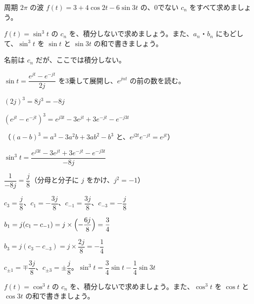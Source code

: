 \begin{jibun}
周期 $2\pi$ の波 $f(t)=3+4\cos2t-6\sin3t$ の、0でない $c_n$ をすべて求めましょう。
\end{jibun}


\begin{reidai}
$f(t)=\sin^3t$ の $c_n$ を、積分しないで求めましょう。また、$a_n$・$b_n$ にもどして、$\sin^3t$ を $\sin t$ と $\sin3t$ の和で書きましょう。\par
\kangaekata {}\par
{}\enspace 名前は $c_n$ だが、ここでは積分しない。\par
{}\enspace $\sin t=\dfrac{e^{jt}-e^{-jt}}{2j}$ を3乗して展開し、$e^{jnt}$ の前の数を読む。\par
\shiki\kixds{}\zw{} $(2j)^3=8j^3=-8j$\par
\kixda $(e^{jt}-e^{-jt})^3=e^{j3t}-3e^{jt}+3e^{-jt}-e^{-j3t}$\par
\kixdb （$(a-b)^3=a^3-3a^2b+3ab^2-b^3$ と、$e^{j2t}e^{-jt}=e^{jt}$）\par
\kixda $\sin^3t=\dfrac{e^{j3t}-3e^{jt}+3e^{-jt}-e^{-j3t}}{-8j}$\par
\kixda $\dfrac{1}{-8j}=\dfrac{j}{8}$（分母と分子に $j$ をかけ、$j^2=-1$）\par
\kixda $c_3=\dfrac{j}{8}$、$c_1=-\dfrac{3j}{8}$、$c_{-1}=\dfrac{3j}{8}$、$c_{-3}=-\dfrac{j}{8}$\par
\kixda $b_1=j(c_1-c_{-1})=j\times\Bigl(-\dfrac{6j}{8}\Bigr)=\dfrac{3}{4}$\par
\kixda $b_3=j(c_3-c_{-3})=j\times\dfrac{2j}{8}=-\dfrac{1}{4}$\par
\kotae $c_{\pm1}=\mp\dfrac{3j}{8}$、$c_{\pm3}=\pm\dfrac{j}{8}$。$\sin^3t=\dfrac34\sin t-\dfrac14\sin3t$
\end{reidai}

\begin{jibun}
$f(t)=\cos^3t$ の $c_n$ を、積分しないで求めましょう。また、$\cos^3t$ を $\cos t$ と $\cos3t$ の和で書きましょう。
\end{jibun}



